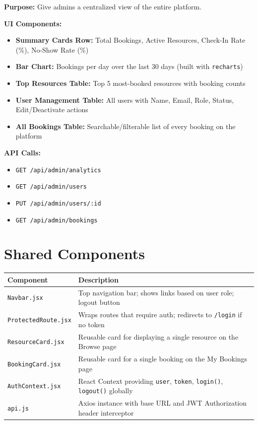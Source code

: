 \documentclass[12pt]{article}
\begin{document}
\textbf{Purpose:} Give admins a centralized view of the entire platform.

\textbf{UI Components:}
\begin{itemize}
    \item \textbf{Summary Cards Row:} Total Bookings, Active Resources, Check-In Rate (\%), No-Show Rate (\%)
    \item \textbf{Bar Chart:} Bookings per day over the last 30 days (built with \texttt{recharts})
    \item \textbf{Top Resources Table:} Top 5 most-booked resources with booking counts
    \item \textbf{User Management Table:} All users with Name, Email, Role, Status, Edit/Deactivate actions
    \item \textbf{All Bookings Table:} Searchable/filterable list of every booking on the platform
\end{itemize}

\textbf{API Calls:}
\begin{itemize}
    \item \texttt{GET /api/admin/analytics}
    \item \texttt{GET /api/admin/users}
    \item \texttt{PUT /api/admin/users/:id}
    \item \texttt{GET /api/admin/bookings}
\end{itemize}

\section{Shared Components}

\begin{longtable}{|p{4cm}|p{9cm}|}
\hline
\textbf{Component} & \textbf{Description} \\
\hline
\texttt{Navbar.jsx} & Top navigation bar; shows links based on user role; logout button \\
\hline
\texttt{ProtectedRoute.jsx} & Wraps routes that require auth; redirects to \texttt{/login} if no token \\
\hline
\texttt{ResourceCard.jsx} & Reusable card for displaying a single resource on the Browse page \\
\hline
\texttt{BookingCard.jsx} & Reusable card for a single booking on the My Bookings page \\
\hline
\texttt{AuthContext.jsx} & React Context providing \texttt{user}, \texttt{token}, \texttt{login()}, \texttt{logout()} globally \\
\hline
\texttt{api.js} & Axios instance with base URL and JWT Authorization header interceptor \\
\hline
\end{longtable}
\end{document}
